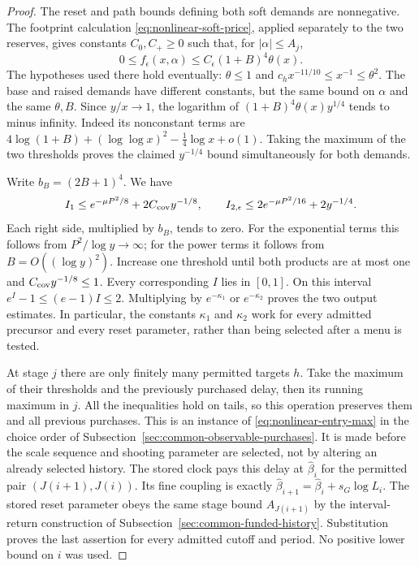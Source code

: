 \begin{proof}
The reset and path bounds defining both soft demands are nonnegative.
The footprint calculation \eqref{eq:nonlinear-soft-price}, applied
separately to the two reserves, gives constants $C_0,C_+\ge0$ such
that, for $|\alpha|\le A_j$,
\[
 0\le f_\epsilon(x,\alpha)
       \le C_\epsilon(1+B)^4\theta(x).
\]
The hypotheses used there hold eventually: $\theta\le1$ and
$c_hx^{-11/10}\le x^{-1}\le\theta^2$. The base and raised
demands have different constants, but the same bound on $\alpha$
and the same $\theta,B$. Since $y/x\to1$, the logarithm of
$(1+B)^4\theta(x)y^{1/4}$ tends to minus infinity. Indeed its
nonconstant terms are
$4\log(1+B)+(\log\log x)^2-\frac14\log x+o(1)$.
Taking the maximum of the two thresholds proves the claimed
$y^{-1/4}$ bound simultaneously for both demands.

Write $b_B=(2B+1)^4$. We have
\[
 I_1\le e^{-\mu P^2/8}+2C_{\rm cov}y^{-1/8},\qquad
 I_{2,\epsilon}\le2e^{-\mu P^2/16}+2y^{-1/4}.
\]
Each right side, multiplied by $b_B$, tends to zero. For the
exponential terms this follows from $P^2/\log y\to\infty$;
for the power terms it follows from $B=O((\log y)^2)$.
Increase one threshold until both products are at most one and
$C_{\rm cov}y^{-1/8}\le1$. Every corresponding $I$ lies in
$[0,1]$. On this interval $e^I-1\le(e-1)I\le2$.
Multiplying by $e^{-\kappa_1}$ or $e^{-\kappa_2}$ proves the
two output estimates. In particular, the constants $\kappa_1$
and $\kappa_2$ work for every admitted precursor and every reset
parameter, rather than being selected after a menu is tested.

At stage $j$ there are only finitely many permitted targets $h$.
Take the maximum of their thresholds and the previously purchased
delay, then its running maximum in $j$. All the inequalities hold
on tails, so this operation preserves them and all previous
purchases. This is an instance of \eqref{eq:nonlinear-entry-max}
in the choice order of Subsection~\ref{sec:common-observable-purchases}.
It is made before the scale sequence and shooting parameter are
selected, not by altering an already selected history. The stored
clock pays this delay at $\widehat\beta_i$ for the permitted pair
$(J(i+1),J(i))$. Its fine coupling is exactly
$\widehat\beta_{i+1}=\widehat\beta_i+s_G\log L_i$.
The stored reset parameter obeys the same stage bound $A_{J(i+1)}$
by the interval-return construction of
Subsection~\ref{sec:common-funded-history}. Substitution proves the
last assertion for every admitted cutoff and period. No positive
lower bound on $i$ was used.
\end{proof}

